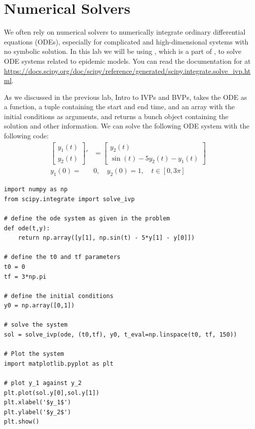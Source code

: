 \label{lab:SIRModels}

\section*{Numerical Solvers}
We often rely on numerical solvers to numerically integrate ordinary differential equations (ODEs), especially for complicated and high-dimensional systems with no symbolic solution.
In this lab we will be using , which is a part of , to solve ODE systems related to epidemic models.
You can read the documentation for  at \url{https://docs.scipy.org/doc/scipy/reference/generated/scipy.integrate.solve_ivp.html}.

As we discussed in the previous lab, Intro to IVPs and BVPs,  takes the ODE as a function, a tuple containing the start and end time, and an array with the initial conditions as arguments, and returns a bunch object containing the solution and other information.
We can solve the following ODE system with the following code:
\begin{equation}\label{ex:ivp-example}
    \begin{aligned}
    \begin{bmatrix} y_1(t) \\ y_2(t)\end{bmatrix}'
    &= \begin{bmatrix} y_2(t) \\ \sin(t) - 5y_2(t) - y_1(t) \end{bmatrix} \\
    y_1(0) = &0, \quad y_2(0)=1, \quad t\in[0,3\pi]
    \end{aligned}
\end{equation}
\begin{lstlisting}
import numpy as np
from scipy.integrate import solve_ivp

# define the ode system as given in the problem
def ode(t,y):
    return np.array([y[1], np.sin(t) - 5*y[1] - y[0]])

# define the t0 and tf parameters
t0 = 0
tf = 3*np.pi

# define the initial conditions
y0 = np.array([0,1])

# solve the system
sol = solve_ivp(ode, (t0,tf), y0, t_eval=np.linspace(t0, tf, 150))

# Plot the system
import matplotlib.pyplot as plt

# plot y_1 against y_2
plt.plot(sol.y[0],sol.y[1])
plt.xlabel('$y_1$')
plt.ylabel('$y_2$')
plt.show()
\end{lstlisting}

